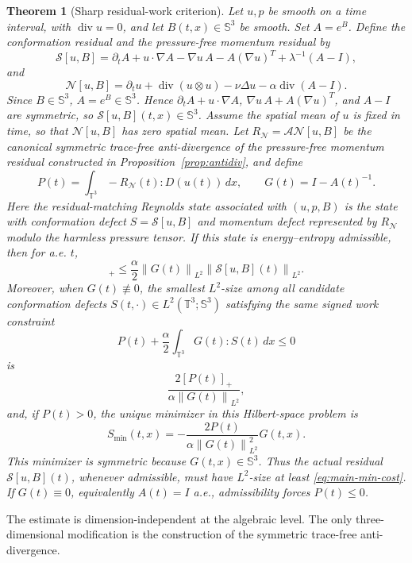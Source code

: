 \documentclass[10pt,a4paper]{amsart}
\numberwithin{equation}{section}
\newtheorem{theorem}{Theorem}[section]
\newcommand{\T}{\mathbb T}
\newcommand{\Id}{I}
\newcommand{\Sym}{\mathbb S}
\newcommand{\divv}{\operatorname{div}}
\newcommand{\calN}{\mathcal N}
\newcommand{\calS}{\mathcal S}
\newcommand{\calA}{\mathcal A}
\newcommand{\norm}[1]{\left\lVert #1\right\rVert}
\begin{document}
\begin{theorem}[Sharp residual-work criterion]
\label{thm:residual-main}
Let \(u,p\) be smooth on a time interval, with \(\divv u=0\), and let
\(B(t,x)\in\Sym^3\) be smooth.  Set \(A=e^B\).  Define the conformation
residual and the pressure-free momentum residual by
\[
  \calS[u,B]
  =
  \partial_t A+u\cdot\nabla A-\nabla u\,A-A(\nabla u)^T
  +\lambda^{-1}(A-\Id),
\]
and
\[
  \calN[u,B]
  =
  \partial_t u+\divv(u\otimes u)-\nu\Delta u-\alpha\divv(A-\Id).
\]
Since \(B\in\Sym^3\), \(A=e^B\in\Sym^3\).  Hence
\(\partial_tA+u\cdot\nabla A\), \(\nabla u\,A+A(\nabla u)^T\), and
\(A-\Id\) are symmetric, so \(\calS[u,B](t,x)\in\Sym^3\).
Assume the spatial mean of \(u\) is fixed in time, so that \(\calN[u,B]\) has
zero spatial mean.  Let
\(R_{\calN}=\calA\calN[u,B]\) be the canonical symmetric trace-free
anti-divergence of the pressure-free momentum residual constructed in
Proposition~\ref{prop:antidiv}, and define
\[
  P(t)=\int_{\T^3}-R_{\calN}(t):D(u(t))\,dx,\qquad
  G(t)=\Id-A(t)^{-1}.
\]
Here the residual-matching Reynolds state associated with \((u,p,B)\) is the
state with conformation defect \(S=\calS[u,B]\) and momentum defect represented
by \(R_{\calN}\) modulo the harmless pressure tensor.  If this state is
energy--entropy admissible, then for a.e. \(t\),
\begin{equation}
  [P(t)]_+
  \le
  \frac{\alpha}{2}
  \norm{G(t)}_{L^2}\norm{\calS[u,B](t)}_{L^2}.
  \label{eq:main-residual-cost}
\end{equation}
Moreover, when \(G(t)\not\equiv0\), the smallest \(L^2\)-size among all
candidate conformation defects \(S(t,\cdot)\in L^2(\T^3;\Sym^3)\) satisfying
the same signed work constraint
\[
  P(t)+\frac{\alpha}{2}\int_{\T^3}G(t):S(t)\,dx\le0
\]
is
\begin{equation}
  \frac{2[P(t)]_+}{\alpha\norm{G(t)}_{L^2}},
  \label{eq:main-min-cost}
\end{equation}
and, if \(P(t)>0\), the unique minimizer in this Hilbert-space problem is
\[
  S_{\min}(t,x)
  =
  -\frac{2P(t)}{\alpha\norm{G(t)}_{L^2}^2}G(t,x).
\]
This minimizer is symmetric because \(G(t,x)\in\Sym^3\).
Thus the actual residual \(\calS[u,B](t)\), whenever admissible, must have
\(L^2\)-size at least \eqref{eq:main-min-cost}.
If \(G(t)\equiv0\), equivalently \(A(t)=\Id\) a.e., admissibility forces
\(P(t)\le0\).
\end{theorem}


The estimate is dimension-independent at the algebraic level.  The only
three-dimensional modification is the construction of the symmetric
trace-free anti-divergence.
\end{document}
